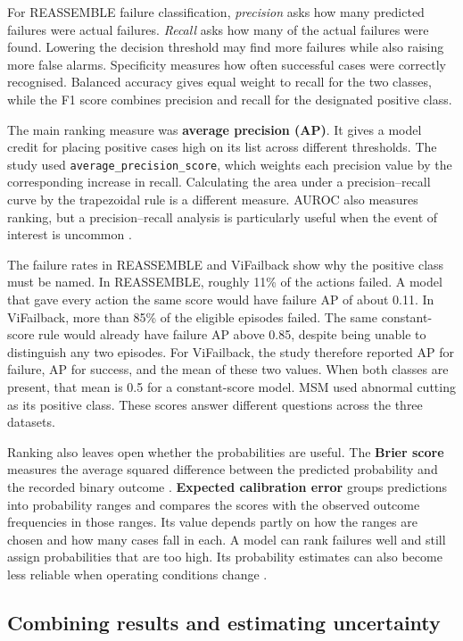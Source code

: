For REASSEMBLE failure classification, \emph{precision} asks how many predicted failures
were actual failures. \emph{Recall} asks how many of the actual failures were found.
Lowering the decision threshold may find more failures while also raising more false
alarms. Specificity measures how often successful cases were correctly recognised.
Balanced accuracy gives equal weight to recall for the two classes, while the F1 score
combines precision and recall for the designated positive class.

The main ranking measure was \textbf{average precision (AP)}. It gives a model credit
for placing positive cases high on its list across different thresholds. The study used
\texttt{average\_precision\_score}, which weights each precision value by the
corresponding increase in recall. Calculating the area under a precision–recall curve by
the trapezoidal rule is a different measure. AUROC also measures ranking, but a
precision–recall analysis is particularly useful when the event of interest is uncommon
\parencite{Saito2015PrecisionRecall}.

The failure rates in REASSEMBLE and ViFailback show why the positive class must be
named. In REASSEMBLE, roughly 11\% of the actions failed. A model that gave every action
the same score would have failure AP of about 0.11. In ViFailback, more than 85\% of the
eligible episodes failed. The same constant-score rule would already have failure AP
above 0.85, despite being unable to distinguish any two episodes. For ViFailback, the
study therefore reported AP for failure, AP for success, and the mean of these two
values. When both classes are present, that mean is 0.5 for a constant-score model. MSM
used abnormal cutting as its positive class. These scores answer different questions
across the three datasets.

Ranking also leaves open whether the probabilities are useful. The \textbf{Brier score}
measures the average squared difference between the predicted probability and the
recorded binary outcome \parencite{P055}. \textbf{Expected calibration error} groups
predictions into probability ranges and compares the scores with the observed outcome
frequencies in those ranges. Its value depends partly on how the ranges are chosen and
how many cases fall in each. A model can rank failures well and still assign
probabilities that are too high. Its probability estimates can also become less reliable
when operating conditions change \parencite{P008}.

\subsection{Combining results and estimating uncertainty}

